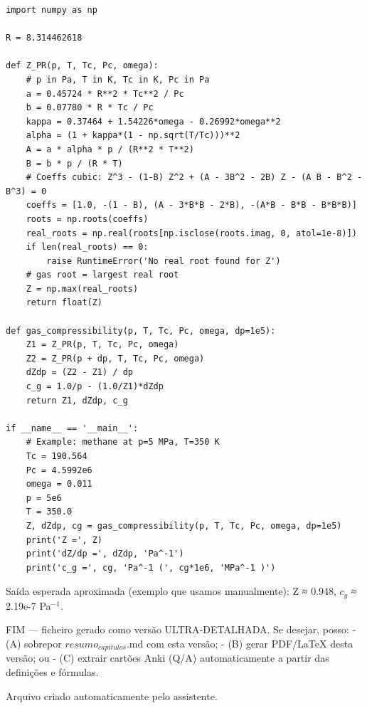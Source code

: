 \documentclass[11pt,a4paper]{article}
\begin{document}
\begin{Verbatim}
import numpy as np

R = 8.314462618

def Z_PR(p, T, Tc, Pc, omega):
	# p in Pa, T in K, Tc in K, Pc in Pa
	a = 0.45724 * R**2 * Tc**2 / Pc
	b = 0.07780 * R * Tc / Pc
	kappa = 0.37464 + 1.54226*omega - 0.26992*omega**2
	alpha = (1 + kappa*(1 - np.sqrt(T/Tc)))**2
	A = a * alpha * p / (R**2 * T**2)
	B = b * p / (R * T)
	# Coeffs cubic: Z^3 - (1-B) Z^2 + (A - 3B^2 - 2B) Z - (A B - B^2 - B^3) = 0
	coeffs = [1.0, -(1 - B), (A - 3*B*B - 2*B), -(A*B - B*B - B*B*B)]
	roots = np.roots(coeffs)
	real_roots = np.real(roots[np.isclose(roots.imag, 0, atol=1e-8)])
	if len(real_roots) == 0:
		raise RuntimeError('No real root found for Z')
	# gas root = largest real root
	Z = np.max(real_roots)
	return float(Z)

def gas_compressibility(p, T, Tc, Pc, omega, dp=1e5):
	Z1 = Z_PR(p, T, Tc, Pc, omega)
	Z2 = Z_PR(p + dp, T, Tc, Pc, omega)
	dZdp = (Z2 - Z1) / dp
	c_g = 1.0/p - (1.0/Z1)*dZdp
	return Z1, dZdp, c_g

if __name__ == '__main__':
	# Example: methane at p=5 MPa, T=350 K
	Tc = 190.564
	Pc = 4.5992e6
	omega = 0.011
	p = 5e6
	T = 350.0
	Z, dZdp, cg = gas_compressibility(p, T, Tc, Pc, omega, dp=1e5)
	print('Z =', Z)
	print('dZ/dp =', dZdp, 'Pa^-1')
	print('c_g =', cg, 'Pa^-1 (', cg*1e6, 'MPa^-1 )')
\end{Verbatim}

Saída esperada aproximada (exemplo que usamos manualmente): Z ≈ 0.948, $c_{g}$ ≈ 2.19e-7 Pa$^{-1}$.


FIM — ficheiro gerado como versão ULTRA‑DETALHADA. Se desejar, posso:
- (A) sobrepor $resumo_{capitulos}$.md com esta versão;
- (B) gerar PDF/LaTeX desta versão; ou
- (C) extrair cartões Anki (Q/A) automaticamente a partir das definições e fórmulas.

Arquivo criado automaticamente pelo assistente.
\end{document}
